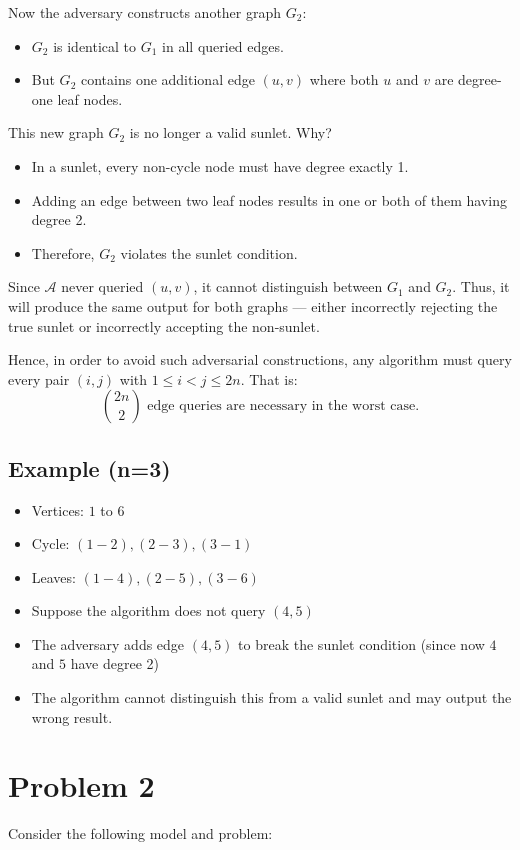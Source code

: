 \documentclass[12pt]{article}
\begin{document}
	Now the adversary constructs another graph $G_2$:
	\begin{itemize}
		\item $G_2$ is identical to $G_1$ in all queried edges.
		\item But $G_2$ contains one additional edge $(u, v)$ where both $u$ and $v$ are degree-one leaf nodes.
	\end{itemize}
	
	This new graph $G_2$ is no longer a valid sunlet. Why?
	\begin{itemize}
		\item In a sunlet, every non-cycle node must have degree exactly 1.
		\item Adding an edge between two leaf nodes results in one or both of them having degree 2.
		\item Therefore, $G_2$ violates the sunlet condition.
	\end{itemize}
	
	Since $\mathcal{A}$ never queried $(u,v)$, it cannot distinguish between $G_1$ and $G_2$.
	Thus, it will produce the same output for both graphs — either incorrectly rejecting the true sunlet or incorrectly accepting the non-sunlet.
	
	Hence, in order to avoid such adversarial constructions, any algorithm must query every pair $(i, j)$ with $1 \le i < j \le 2n$. That is:
	\[
	\boxed{\binom{2n}{2}} \text{ edge queries are necessary in the worst case.}
	\]
	
	\subsection*{Example (n=3)}
	\begin{itemize}
		\item Vertices: $1$ to $6$
		\item Cycle: $(1{-}2), (2{-}3), (3{-}1)$
		\item Leaves: $(1{-}4), (2{-}5), (3{-}6)$
		\item Suppose the algorithm does not query $(4,5)$
		\item The adversary adds edge $(4,5)$ to break the sunlet condition (since now $4$ and $5$ have degree 2)
		\item The algorithm cannot distinguish this from a valid sunlet and may output the wrong result.
	\end{itemize}
	
	\vspace{1em}
	
	\section*{Problem 2}
	Consider the following model and problem:
	
\end{document}
